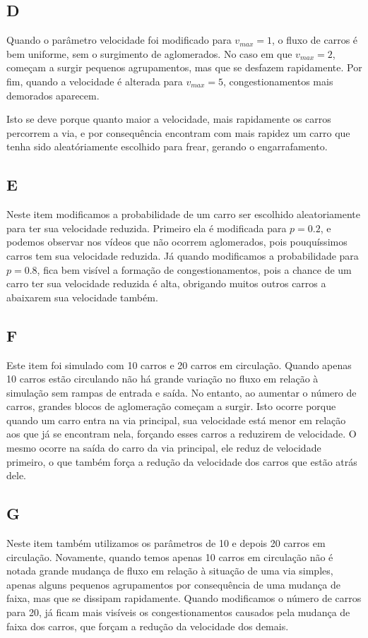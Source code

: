 \documentclass[a4paper, 12pt]{article}
\begin{document}
\subsection*{D}
Quando o parâmetro velocidade foi modificado para $v_{max} = 1$, o fluxo de carros é
bem uniforme, sem o surgimento de aglomerados. No caso em que $v_{max} = 2$, começam
a surgir pequenos agrupamentos, mas que se desfazem rapidamente. Por fim,
quando a velocidade é alterada para $v_{max} = 5$, congestionamentos mais demorados
aparecem. 

Isto se deve porque quanto maior a velocidade, mais rapidamente os carros 
percorrem a via, e por consequência encontram com mais rapidez um carro
que tenha sido aleatóriamente escolhido para frear, gerando o engarrafamento.

\subsection*{E}
Neste item modificamos a probabilidade de um carro ser escolhido aleatoriamente para ter sua
velocidade reduzida. Primeiro ela é modificada para $p = 0.2$, e podemos observar nos
vídeos que não ocorrem aglomerados, pois pouquíssimos carros tem sua velocidade reduzida.
Já quando modificamos a probabilidade para $p = 0.8$, fica bem visível a formação de
congestionamentos, pois a chance de um carro ter sua velocidade reduzida é alta, obrigando muitos
outros carros a abaixarem sua velocidade também. 

\subsection*{F}
Este item foi simulado com 10 carros e 20 carros em circulação. Quando apenas 10 carros estão
circulando não há grande variação no fluxo em relação à simulação sem rampas de entrada e saída.
No entanto, ao aumentar o número de carros, grandes blocos de aglomeração começam a surgir. Isto
ocorre porque quando um carro entra na via principal, sua velocidade está menor em relação aos que
já se encontram nela, forçando esses carros a reduzirem de velocidade. O mesmo ocorre na saída
do carro da via principal, ele reduz de velocidade primeiro, o que também força a redução da velocidade
dos carros que estão atrás dele.

\subsection*{G}
Neste item também utilizamos os parâmetros de 10 e depois 20 carros em circulação.
Novamente, quando temos apenas 10 carros em circulação não é notada grande mudança de fluxo 
em relação à situação de uma via simples, apenas alguns pequenos agrupamentos por consequência
de uma mudança de faixa, mas que se dissipam rapidamente.
Quando modificamos o número de carros para 20, já ficam mais visíveis os congestionamentos causados
pela mudança de faixa dos carros, que forçam a redução da velocidade dos demais.
\end{document}
